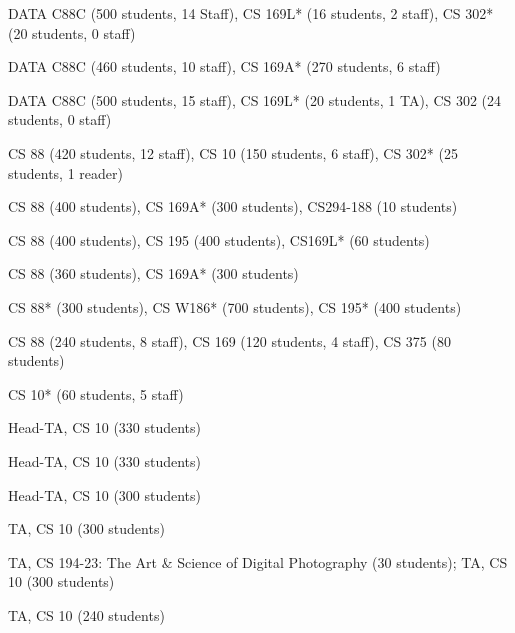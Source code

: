 \begin{itemize}
    \setlength\itemsep{0.7em}


    
     {DATA C88C (500 students, 14 Staff), CS 169L* (16 students, 2 staff), CS 302* (20 students, 0 staff)}
    
     {DATA C88C (460 students, 10 staff), CS 169A* (270 students, 6 staff)}


     {DATA C88C (500 students, 15 staff), CS 169L* (20 students, 1 TA), CS 302 (24 students, 0 staff)}
    


     {CS 88 (420 students, 12 staff), CS 10 (150 students, 6 staff), CS 302* (25 students, 1 reader)}

     {CS 88 (400 students), CS 169A* (300 students), CS294-188 (10 students)}

     {CS 88 (400 students), CS 195 (400 students), CS169L* (60 students)}

     {CS 88 (360 students), CS 169A* (300 students)}

     {CS 88* (300 students), CS W186* (700 students), CS 195* (400 students)}
      
     {CS 88 (240 students, 8 staff), CS 169 (120 students, 4 staff), CS 375 (80 students)}

     CS 10* (60 students, 5 staff)

     {Head-TA, CS 10 (330 students)}
    
     {Head-TA, CS 10 (330 students)}
    
     {Head-TA, CS 10 (300 students)}
    
     {TA, CS 10 (300 students)}
    
     {TA, CS 194-23: The Art \& Science of Digital Photography (30 students); TA, CS 10 (300 students)}
    
     {TA, CS 10 (240 students)}
\end{itemize}
